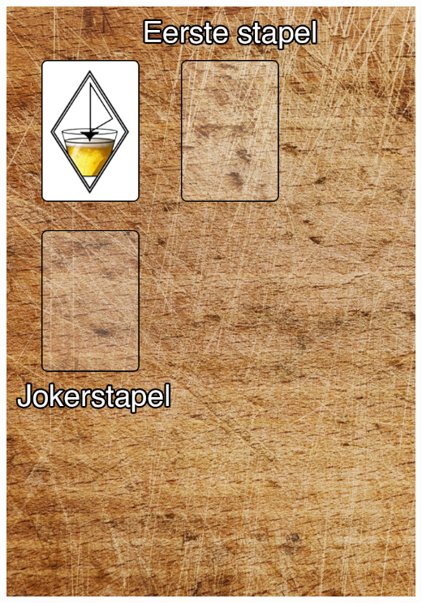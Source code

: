 \begin{minipage}[t]{.48\textwidth}
\includegraphics[width=.96\textwidth]{img/Frits_plank_v3.png}
\end{minipage}
\hfill \vrule \hspace{0.35cm}
